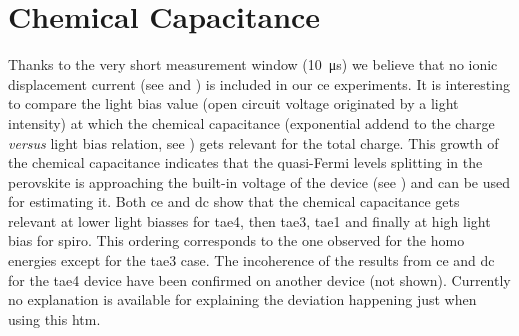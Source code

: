 \section{Chemical Capacitance}

	\begin{figure}
	\end{figure}

	Thanks to the very short measurement window (\SI{10}{\us}) we believe that no ionic displacement current (see  and ) is included in our \gls{ce} experiments.
	It is interesting to compare the light bias value (open circuit voltage originated by a light intensity) at which the chemical capacitance (exponential addend to the charge \textsl{versus} light bias relation, see ) gets relevant for the total charge.
	This growth of the chemical capacitance indicates that the quasi\hyp{}Fermi levels splitting in the perovskite is approaching the built-in voltage of the device (see ) and can be used for estimating it.
	Both \gls{ce} and \gls{dc} show that the chemical capacitance gets relevant at lower light biasses for \gls{tae4}, then \gls{tae3}, \gls{tae1} and finally at high light bias for \gls{spiro}.
	This ordering corresponds to the one observed for the \gls{homo} energies except for the \gls{tae3} case.
	The incoherence of the results from \gls{ce} and \gls{dc} for the \gls{tae4} device have been confirmed on another device (not shown).
	Currently no explanation is available for explaining the deviation happening just when using this \gls{htm}.
	
